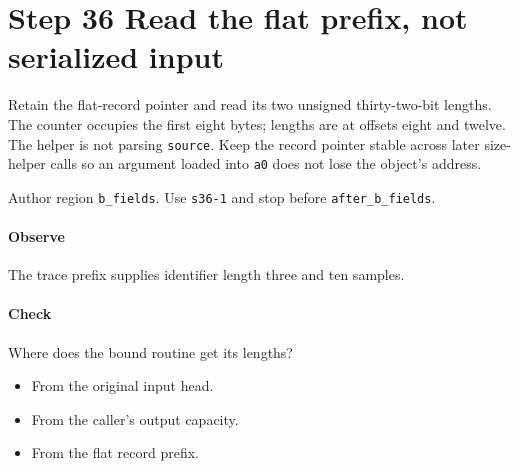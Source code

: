 \section{Step 36 Read the flat prefix, not serialized input}\label{cbor-s36}
Retain the flat-record pointer and read its two unsigned thirty-two-bit lengths. The counter occupies the first eight bytes; lengths are at offsets eight and twelve. The helper is not parsing \texttt{source}. Keep the record pointer stable across later size-helper calls so an argument loaded into \texttt{a0} does not lose the object's address.

Author region \texttt{b\_fields}. Use \texttt{s36-1} and stop before \texttt{after\_b\_fields}.

\paragraph{Observe} The trace prefix supplies identifier length three and ten samples.

\paragraph{Check} Where does the bound routine get its lengths?
\begin{itemize}
  \item[A.] From the original input head.
  \item[B.] From the caller's output capacity.
  \item[C.] From the flat record prefix.
\end{itemize}
